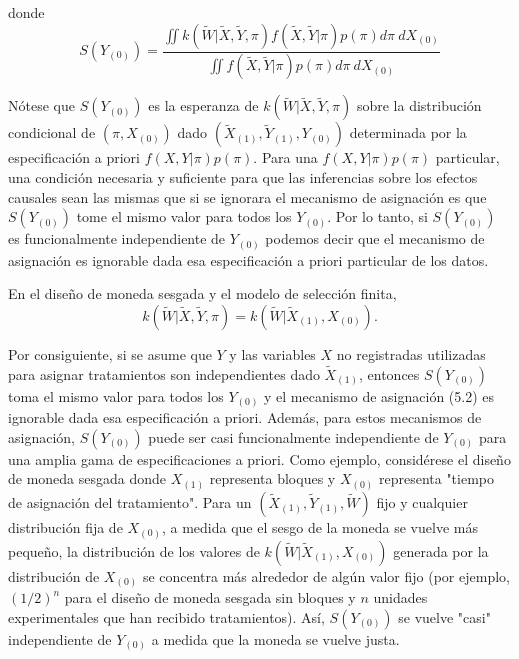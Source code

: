 \documentclass[12pt,a4paper]{article}
\begin{document}
{{\noindent donde
\begin{equation*}
S(Y_{(0)}) = \frac{\iint k(\tilde{W}|\tilde{X},\tilde{Y},\pi)f(\tilde{X},\tilde{Y}|\pi)p(\pi)d\pi~dX_{(0)}}{\iint f(\tilde{X},\tilde{Y}|\pi)p(\pi)d\pi~dX_{(0)}}
\end{equation*} 

Nótese que $S(Y_{(0)})$ es la esperanza de $k(\tilde{W}|\tilde{X},\tilde{Y},\pi)$ sobre la distribución condicional de $(\pi, X_{(0)})$ dado $(\tilde{X}_{(1)}, \tilde{Y}_{(1)}, Y_{(0)})$ determinada por la especificación a priori $f(X,Y|\pi)p(\pi)$. Para una $f(X,Y|\pi)p(\pi)$ particular, una condición necesaria y suficiente para que las inferencias sobre los efectos causales sean las mismas que si se ignorara el mecanismo de asignación es que $S(Y_{(0)})$ tome el mismo valor para todos los $Y_{(0)}$. Por lo tanto, si $S(Y_{(0)})$ es funcionalmente independiente de $Y_{(0)}$ podemos decir que el mecanismo de asignación es ignorable dada esa especificación a priori particular de los datos.

En el diseño de moneda sesgada y el modelo de selección finita, 
\begin{equation}\label{eq:5.2}
k(\tilde{W}|\tilde{X},\tilde{Y},\pi) = k(\tilde{W}|\tilde{X}_{(1)},X_{(0)}). \tag{5.2}
\end{equation} 

Por consiguiente, si se asume que $Y$ y las variables $X$ no registradas utilizadas para asignar tratamientos son independientes dado $\tilde{X}_{(1)}$, entonces $S(Y_{(0)})$ toma el mismo valor para todos los $Y_{(0)}$ y el mecanismo de asignación (5.2) es ignorable dada esa especificación a priori. Además, para estos mecanismos de asignación, $S(Y_{(0)})$ puede ser casi funcionalmente independiente de $Y_{(0)}$ para una amplia gama de especificaciones a priori. Como ejemplo, considérese el diseño de moneda sesgada donde $X_{(1)}$ representa bloques y $X_{(0)}$ representa "tiempo de asignación del tratamiento". Para un $(\tilde{X}_{(1)}, \tilde{Y}_{(1)}, \tilde{W})$ fijo y cualquier distribución fija de $X_{(0)}$, a medida que el sesgo de la moneda se vuelve más pequeño, la distribución de los valores de $k(\tilde{W}|\tilde{X}_{(1)},X_{(0)})$ generada por la distribución de $X_{(0)}$ se concentra más alrededor de algún valor fijo (por ejemplo, $(1/2)^n$ para el diseño de moneda sesgada sin bloques y $n$ unidades experimentales que han recibido tratamientos). Así, $S(Y_{(0)})$ se vuelve "casi" independiente de $Y_{(0)}$ a medida que la moneda se vuelve justa.

}}
\end{document}
